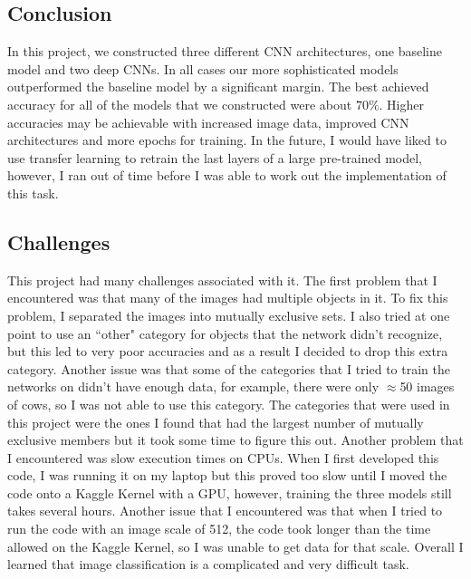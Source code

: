 \documentclass[10pt,a4paper]{article}
\begin{document}
\subsection{Conclusion}
In this project, we constructed three different CNN architectures, one baseline model and two deep CNNs. In all cases our more sophisticated models outperformed the baseline model by a significant margin. The best achieved accuracy for all of the models that we constructed were about $70 \%$. Higher accuracies may be achievable with increased image data, improved CNN architectures and more epochs for training. In the future, I would have liked to use transfer learning to retrain the last layers of a large pre-trained model, however, I ran out of time before I was able to work out the implementation of this task.

\newpage
\subsection{Challenges}
This project had many challenges associated with it. The first problem that I encountered was that many of the images had multiple objects in it. To fix this problem, I separated the images into mutually exclusive sets. I also tried at one point to use an ``other" category for objects that the network didn't recognize, but this led to very poor accuracies and as a result I decided to drop this extra category. Another issue was that some of the categories that I tried to train the networks on didn't have enough data, for example, there were only $\approx$50 images of cows, so I was not able to use this category. The categories that were used in this project were the ones I found that had the largest number of mutually exclusive members but it took some time to figure this out. Another problem that I encountered was slow execution times on CPUs. When I first developed this code, I was running it on my laptop but this proved too slow until I moved the code onto a Kaggle Kernel with a GPU, however, training the three models still takes several hours. Another issue that I encountered was that when I tried to run the code with an image scale of 512, the code took longer than the time allowed on the Kaggle Kernel, so I was unable to get data for that scale. Overall I learned that image classification is a complicated and very difficult task.
\end{document}
